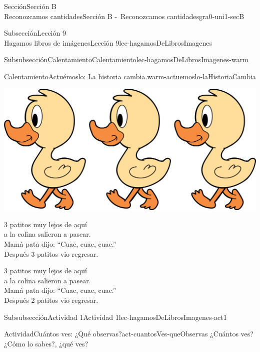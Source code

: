 \begin{sectionptx}{Sección}{{\Large Sección B\\}Reconozcamos cantidades}{}{Sección B -~Reconozcamos cantidades}{}{}{gra0-uni1-secB}
\begin{subsectionptx}{Subsección}{{\normalsize Lección 9\\[-0.05cm]}Hagamos libros de imágenes}{}{Lección 9}{}{}{lec-hagamosDeLibrosImagenes}
\begin{subsubsectionptx}{Subsubsección}{Calentamiento}{}{Calentamiento}{}{}{lec-hagamosDeLibrosImagenes-warm}
\begin{exploration}{Calentamiento}{Actuémoslo: La historia cambia.}{warm-actuemoslo-laHistoriaCambia}
\begin{image}{0.0}{1}{0.0}{}
\includegraphics[max width=\linewidth, center]{external/png-source/3 ducks.png}
\end{image}%
%
\par
\vspace*{2ex}
3 patitos muy lejos de aquí\\
 a la colina salieron a pasear.\\
 Mamá pata dijo: “Cuac, cuac, cuac.”\\
 Después 3 patitos vio regresar.%
\par
3 patitos muy lejos de aquí\\
 a la colina salieron a pasear.\\
 Mamá pata dijo: “Cuac, cuac, cuac.”\\
 Después 2 patitos vio regresar.%
\end{exploration}%
\end{subsubsectionptx}
%
%
\typeout{************************************************}
\typeout{************************************************}
%
\clearpage
\begin{subsubsectionptx}{Subsubsección}{Actividad 1}{}{Actividad 1}{}{}{lec-hagamosDeLibrosImagenes-act1}
\begin{activity}{Actividad}{Cuántos ves: ¿Qué observas?}{act-cuantosVes-queObservas}%
¿Cuántos ves?\\
 ¿Cómo lo sabes?, ¿qué ves?%
\begin{sidebyside}{2}{0}{0}{0}%
\begin{sbspanel}{0.5}%

\end{sbspanel}
\end{sidebyside}
\end{activity}
\end{subsubsectionptx}
\end{subsectionptx}
\end{sectionptx}
